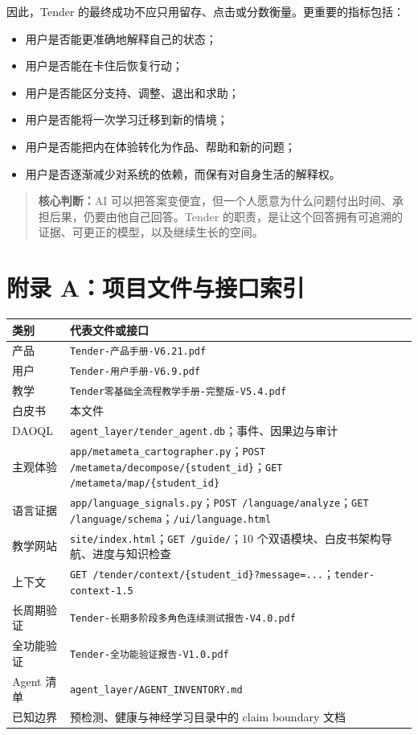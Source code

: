 \documentclass[UTF8,a4paper,11pt]{ctexart}
\newcommand{\keypoint}[1]{\begin{quote}\noindent\textbf{\color{TenderBlue}核心判断：}#1\end{quote}}
\begin{document}
因此，Tender 的最终成功不应只用留存、点击或分数衡量。更重要的指标包括：

\begin{itemize}
\item 用户是否能更准确地解释自己的状态；
\item 用户是否能在卡住后恢复行动；
\item 用户是否能区分支持、调整、退出和求助；
\item 用户是否能将一次学习迁移到新的情境；
\item 用户是否能把内在体验转化为作品、帮助和新的问题；
\item 用户是否逐渐减少对系统的依赖，而保有对自身生活的解释权。
\end{itemize}

\keypoint{AI 可以把答案变便宜，但一个人愿意为什么问题付出时间、承担后果，仍要由他自己回答。Tender 的职责，是让这个回答拥有可追溯的证据、可更正的模型，以及继续生长的空间。}

\newpage
\appendix
\section{附录 A：项目文件与接口索引}

\begin{center}
\begin{longtable}{@{}p{4.2cm}p{8.8cm}@{}}
\toprule
\textbf{类别} & \textbf{代表文件或接口} \\
\midrule
产品 & \texttt{Tender-产品手册-V6.21.pdf} \\
用户 & \texttt{Tender-用户手册-V6.9.pdf} \\
教学 & \texttt{Tender零基础全流程教学手册-完整版-V5.4.pdf} \\
白皮书 & 本文件 \\
DAOQL & \texttt{agent\_layer/tender\_agent.db}；事件、因果边与审计 \\
主观体验 & \texttt{app/metameta\_cartographer.py}；\texttt{POST /metameta/decompose/\{student\_id\}}；\texttt{GET /metameta/map/\{student\_id\}} \\
语言证据 & \texttt{app/language\_signals.py}；\texttt{POST /language/analyze}；\texttt{GET /language/schema}；\texttt{/ui/language.html} \\
教学网站 & \texttt{site/index.html}；\texttt{GET /guide/}；10 个双语模块、白皮书架构导航、进度与知识检查 \\
上下文 & \texttt{GET /tender/context/\{student\_id\}?message=...}；\texttt{tender-context-1.5} \\
长周期验证 & \texttt{Tender-长期多阶段多角色连续测试报告-V4.0.pdf} \\
全功能验证 & \texttt{Tender-全功能验证报告-V1.0.pdf} \\
Agent 清单 & \texttt{agent\_layer/AGENT\_INVENTORY.md} \\
已知边界 & 预检测、健康与神经学习目录中的 claim boundary 文档 \\
\bottomrule
\end{longtable}
\end{center}
\end{document}
